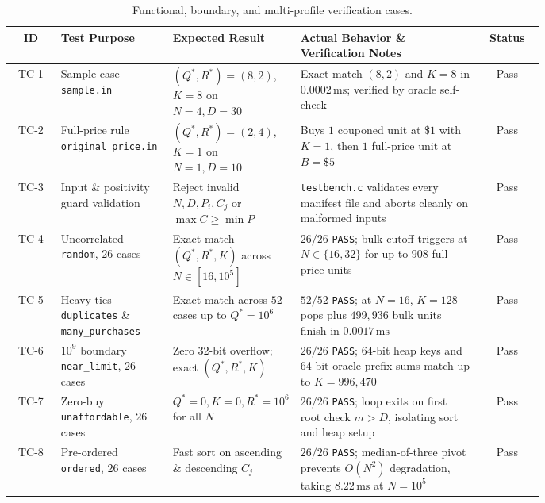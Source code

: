 \documentclass[10pt, a4paper]{article}
\newcommand{\code}[1]{\texttt{\color{primary!90!black}#1}}
\begin{document}
\begin{table}[H]
\centering
\caption{Functional, boundary, and multi-profile verification cases.}
\label{tab:testcases}
\renewcommand{\arraystretch}{1.02}
\setlength{\tabcolsep}{3.4pt}
\footnotesize
\begin{tabular}{@{}c
  >{\raggedright\arraybackslash}p{0.21\linewidth}
  >{\raggedright\arraybackslash}p{0.23\linewidth}
  >{\raggedright\arraybackslash}p{0.34\linewidth}
  c@{}}
\toprule
\textbf{\color{primary}ID} & \textbf{\color{primary}Test Purpose} & \textbf{\color{primary}Expected Result} & \textbf{\color{primary}Actual Behavior \& Verification Notes} & \textbf{\color{primary}Status} \\
\midrule
TC-1 & Sample case \code{sample.in} & $(Q^*, R^*) = (8, 2)$, $K = 8$ on $N = 4, D = 30$ & Exact match $(8, 2)$ and $K = 8$ in $0.0002\,\text{ms}$; verified by oracle self-check & Pass \\
TC-2 & Full-price rule \code{original\_price.in} & $(Q^*, R^*) = (2, 4)$, $K = 1$ on $N = 1, D = 10$ & Buys $1$ couponed unit at $\$1$ with $K = 1$, then $1$ full-price unit at $B = \$5$ & Pass \\
TC-3 & Input \& positivity guard validation & Reject invalid $N, D, P_i, C_j$ or $\max C \ge \min P$ & \code{testbench.c} validates every manifest file and aborts cleanly on malformed inputs & Pass \\
TC-4 & Uncorrelated \code{random}, $26$ cases & Exact match $(Q^*, R^*, K)$ across $N \in [16, 10^5]$ & $26/26$ \code{PASS}; bulk cutoff triggers at $N \in \{16, 32\}$ for up to $908$ full-price units & Pass \\
TC-5 & Heavy ties \code{duplicates} \& \code{many\_purchases} & Exact match across $52$ cases up to $Q^* = 10^6$ & $52/52$ \code{PASS}; at $N = 16$, $K = 128$ pops plus $499{,}936$ bulk units finish in $0.0017\,\text{ms}$ & Pass \\
TC-6 & $10^9$ boundary \code{near\_limit}, $26$ cases & Zero 32-bit overflow; exact $(Q^*, R^*, K)$ & $26/26$ \code{PASS}; 64-bit heap keys and 64-bit oracle prefix sums match up to $K = 996{,}470$ & Pass \\
TC-7 & Zero-buy \code{unaffordable}, $26$ cases & $Q^* = 0, K = 0, R^* = 10^6$ for all $N$ & $26/26$ \code{PASS}; loop exits on first root check $m > D$, isolating sort and heap setup & Pass \\
TC-8 & Pre-ordered \code{ordered}, $26$ cases & Fast sort on ascending \& descending $C_j$ & $26/26$ \code{PASS}; median-of-three pivot prevents $O(N^2)$ degradation, taking $8.22\,\text{ms}$ at $N = 10^5$ & Pass \\
\bottomrule
\end{tabular}
\end{table}
\end{document}
